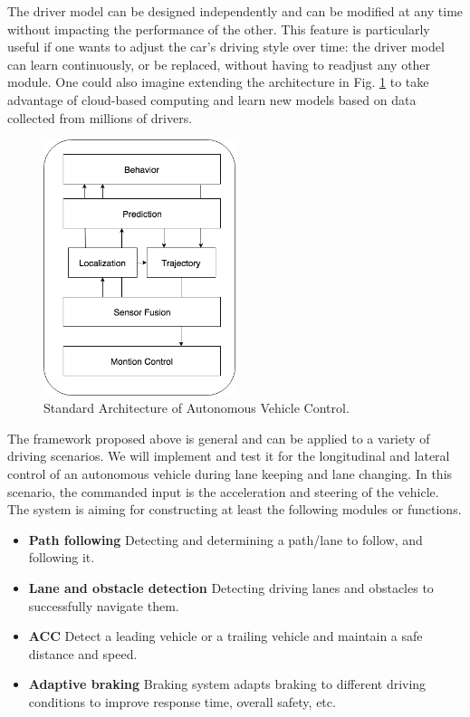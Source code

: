The driver model can be designed independently and can be modified at any time without impacting the performance of the other. This feature is particularly useful if one wants to adjust the car's driving style over time: the driver model can learn continuously, or be replaced, without having to readjust any other module. One could also imagine extending the architecture in Fig. \ref{fig:proposed-architecture} to take advantage of cloud-based computing and learn new models based on data collected from millions of drivers.

\begin{figure}[h]
\centering
\includegraphics[width=0.5\textwidth]{figs/ch3/architecture}
\caption{Standard Architecture of Autonomous Vehicle Control.}
\label{fig:proposed-architecture}
\end{figure}

The framework proposed above is general and can be applied to a variety of driving scenarios. We will implement and test it for the longitudinal and lateral control of an autonomous vehicle during lane keeping and lane changing. In this scenario, the commanded input is the acceleration and steering of the vehicle. The system is aiming for constructing at least the following modules or functions.

\begin{itemize}
\item \textbf{Path following} Detecting and determining a path/lane to follow, and following it.
\item \textbf{Lane and obstacle detection} Detecting driving lanes and obstacles to successfully navigate them.
\item \textbf{ACC} Detect a leading vehicle or a  trailing vehicle and maintain a safe distance and speed.
\item \textbf{Adaptive braking} Braking system adapts braking to different driving conditions to improve response time, overall safety, etc.
\end{itemize}

